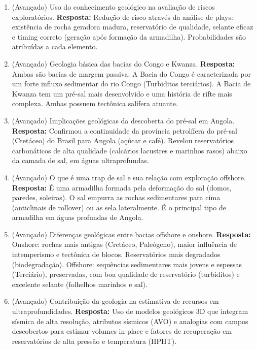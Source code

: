 \documentclass[11pt,a4paper]{article}
\begin{document}
\begin{enumerate}
  \item (Avançado) Uso do conhecimento geológico na avaliação de riscos exploratórios.
  \textbf{Resposta:} Redução de risco através da análise de plays: existência de rocha geradora madura, reservatório de qualidade, selante eficaz e timing correto (geração após formação da armadilha). Probabilidades são atribuídas a cada elemento.

  \item (Avançado) Geologia básica das bacias do Congo e Kwanza.
  \textbf{Resposta:} Ambas são bacias de margem passiva. A Bacia do Congo é caracterizada por um forte influxo sedimentar do rio Congo (Turbiditos terciários). A Bacia de Kwanza tem um pré-sal mais desenvolvido e uma história de rifte mais complexa. Ambas possuem tectônica salífera atuante.

  \item (Avançado) Implicações geológicas da descoberta do pré-sal em Angola.
  \textbf{Resposta:} Confirmou a continuidade da província petrolífera do pré-sal (Cretáceo) do Brasil para Angola (açúcar e café). Revelou reservatórios carbonáticos de alta qualidade (calcários lacustres e marinhos rasos) abaixo da camada de sal, em águas ultraprofundas.

  \item (Avançado) O que é uma trap de sal e sua relação com exploração offshore.
  \textbf{Resposta:} É uma armadilha formada pela deformação do sal (domos, paredes, soleiras). O sal empurra as rochas sedimentares para cima (anticlinais de rollover) ou as sela lateralmente. É o principal tipo de armadilha em águas profundas de Angola.

  \item (Avançado) Diferenças geológicas entre bacias offshore e onshore.
  \textbf{Resposta:} Onshore: rochas mais antigas (Cretáceo, Paleógeno), maior influência de intemperismo e tectônica de blocos. Reservatórios mais degradados (biodegradação). Offshore: sequências sedimentares mais jovens e espessas (Terciário), preservadas, com boa qualidade de reservatório (turbiditos) e excelente selante (folhelhos marinhos e sal).

  \item (Avançado) Contribuição da geologia na estimativa de recursos em ultraprofundidades.
  \textbf{Resposta:} Uso de modelos geológicos 3D que integram sísmica de alta resolução, atributos sísmicos (AVO) e analogias com campos descobertos para estimar volumes in-place e fatores de recuperação em reservatórios de alta pressão e temperatura (HPHT).


\end{enumerate}
\end{document}
